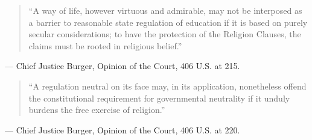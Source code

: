 \documentclass[12pt]{article}
\begin{document}
\begin{quote}
``A way of life, however virtuous and admirable, may not be interposed as a barrier to reasonable state regulation of education if it is based on purely secular considerations; to have the protection of the Religion Clauses, the claims must be rooted in religious belief.''
\end{quote}
\noindent --- Chief Justice Burger, Opinion of the Court, 406 U.S. at 215.

\begin{quote}
``A regulation neutral on its face may, in its application, nonetheless offend the constitutional requirement for governmental neutrality if it unduly burdens the free exercise of religion.''
\end{quote}
\noindent --- Chief Justice Burger, Opinion of the Court, 406 U.S. at 220.
\end{document}
